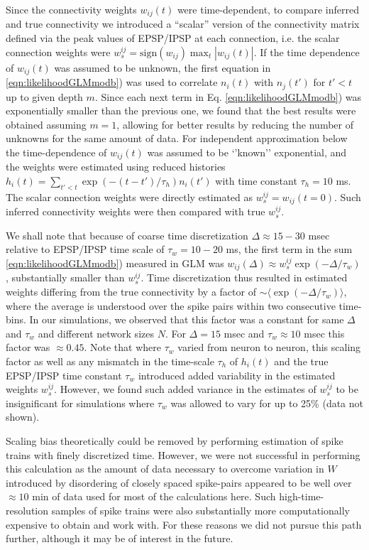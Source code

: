 Since the connectivity weights $w_{ij}(t)$ were time-dependent, to compare inferred and true connectivity we introduced a ``scalar'' version of the connectivity matrix defined via the peak values of EPSP/IPSP at each connection, i.e. the scalar connection weights were $w^{ij}_s=\text{sign}(w_{ij})\max_{t} |w_{ij}(t)|$.  If the time dependence of $w_{ij}(t)$ was assumed to be unknown, the first equation in \eqref{eqn:likelihoodGLMmodb}) was used to correlate $n_i(t)$ with $n_j(t')$ for $t'<t$ up to given depth $m$.  Since each next term in Eq. \eqref{eqn:likelihoodGLMmodb}) was exponentially smaller than the previous one, we found that the best results were obtained assuming $m=1$, allowing for better results by reducing the number of unknowns for the same amount of data.  For independent approximation below the time-dependence of $w_{ij}(t)$ was assumed to be `'known'' exponential, and the weights were estimated using reduced histories $h_{i}(t)=\sum_{t'<t} \exp(-(t-t')/\tau_h)n_{i}(t')$ with time constant $\tau_h=10$ ms. The scalar connection weights were directly estimated as $w^{ij}_s=w_{ij}(t=0)$.  Such inferred connectivity weights were then compared with true $w^{ij}_s$.

We shall note that because of coarse time discretization $\Delta \approx 15-30$ msec relative to EPSP/IPSP time scale of $\tau_w = 10-20$ ms, the first term in the sum \eqref{eqn:likelihoodGLMmodb}) measured in GLM was $w_{ij}(\Delta)\approx w^{ij}_s\exp(-\Delta/\tau_w)$, substantially smaller than $w^{ij}_s$. Time discretization thus resulted in estimated weights differing from the true connectivity by a factor of $\sim \langle \exp(-\Delta/\tau_w) \rangle$, where the average is understood over the spike pairs within two consecutive time-bins. In our simulations, we observed that this factor was a constant for same $\Delta$ and $\tau_w$ and different network sizes $N$. For $\Delta=15$ msec and $\tau_w\approx 10$ msec this factor was  $\approx 0.45$.  Note that where $\tau_w$ varied from neuron to neuron, this scaling factor as well as any mismatch in the time-scale $\tau_h$ of $h_i(t)$ and the true EPSP/IPSP time constant $\tau_w$ introduced added variability in the estimated weights $w^{ij}_s$. However, we found such added variance in the estimates of $w^{ij}_s$ to be insignificant for simulations where $\tau_w$ was allowed to vary for up to 25\% (data not shown).

Scaling bias theoretically could be removed by performing estimation of spike trains with finely discretized time. However, we were not successful in performing this calculation as the amount of data necessary to overcome variation in $W$ introduced by disordering of closely spaced spike-pairs appeared to be well over $\approx 10$ min of data used for most of the calculations here. Such high-time-resolution samples of spike trains were also substantially more computationally expensive to obtain and work with. For these reasons we did not pursue this path further, although it may be of interest in the future.

